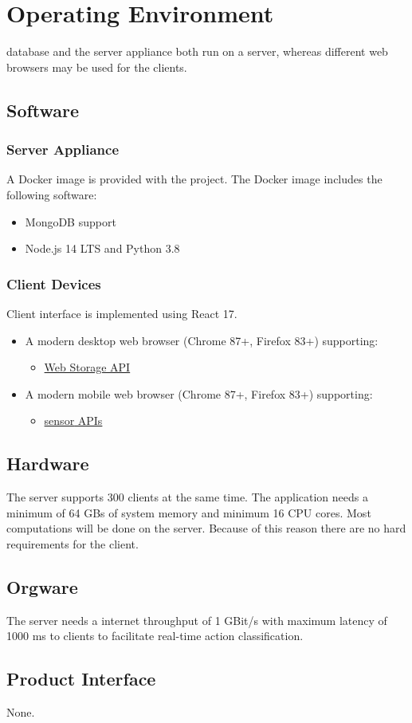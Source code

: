 \section{Operating Environment}

\Gls{database} and the server appliance both run on a server, whereas different web browsers may be used for the clients.

\subsection{Software}
\subsubsection{Server Appliance}
A \Gls{Docker} image is provided with the project. The \Gls{Docker} image includes the following software:
\begin{itemize}
    \item \gls{MongoDB} support
    \item \gls{Node.js} 14 LTS and Python 3.8
\end{itemize}
\subsubsection{Client Devices}
Client interface is implemented using \gls{React} 17.
\begin{itemize}
    \item A modern desktop web browser (Chrome 87+, Firefox 83+) supporting:
    \begin{itemize}
        \item \href{https://developer.mozilla.org/en-US/docs/Web/API/Web_Storage_API}{Web Storage API}
    \end{itemize}
    \item A modern mobile web browser (Chrome 87+, Firefox 83+) supporting:
    \begin{itemize}
        \item \href{https://developer.mozilla.org/en-US/docs/Web/API/Sensor_APIs}{\Gls{sensor} APIs}
    \end{itemize}
\end{itemize}

\subsection{Hardware}

The server supports 300 clients at the same time. The application needs a minimum of 64 GBs of system memory and minimum 16 CPU cores. Most computations will be done on the server. Because of this reason there are no hard requirements for the client.

\subsection{Orgware}
The server needs a internet throughput of 1 GBit/s with maximum latency of 1000 ms to clients to facilitate real-time action \gls{classification}.

\subsection{Product Interface}
None.